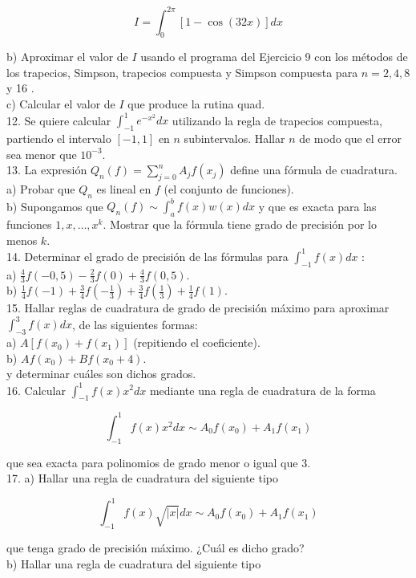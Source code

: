 \documentclass[10pt]{article}
\begin{document}
$$
I=\int_{0}^{2 \pi}[1-\cos (32 x)] d x
$$

b) Aproximar el valor de $I$ usando el programa del Ejercicio 9 con los métodos de los trapecios, Simpson, trapecios compuesta y Simpson compuesta para $n=2,4,8$ y 16 .\\
c) Calcular el valor de $I$ que produce la rutina quad.\\
12. Se quiere calcular $\int_{-1}^{1} e^{-x^{2}} d x$ utilizando la regla de trapecios compuesta, partiendo el intervalo $[-1,1]$ en $n$ subintervalos. Hallar $n$ de modo que el error sea menor que $10^{-3}$.\\
13. La expresión $Q_{n}(f)=\sum_{j=0}^{n} A_{j} f\left(x_{j}\right)$ define una fórmula de cuadratura.\\
a) Probar que $Q_{n}$ es lineal en $f$ (el conjunto de funciones).\\
b) Supongamos que $Q_{n}(f) \sim \int_{a}^{b} f(x) w(x) d x$ y que es exacta para las funciones $1, x, \ldots, x^{k}$. Mostrar que la fórmula tiene grado de precisión por lo menos $k$.\\
14. Determinar el grado de precisión de las fórmulas para $\int_{-1}^{1} f(x) d x$ :\\
a) $\frac{4}{3} f(-0,5)-\frac{2}{3} f(0)+\frac{4}{3} f(0,5)$.\\
b) $\frac{1}{4} f(-1)+\frac{3}{4} f\left(-\frac{1}{3}\right)+\frac{3}{4} f\left(\frac{1}{3}\right)+\frac{1}{4} f(1)$.\\
15. Hallar reglas de cuadratura de grado de precisión máximo para aproximar $\int_{-3}^{3} f(x) d x$, de las siguientes formas:\\
a) $A\left[f\left(x_{0}\right)+f\left(x_{1}\right)\right]$ (repitiendo el coeficiente).\\
b) $A f\left(x_{0}\right)+B f\left(x_{0}+4\right)$.\\
y determinar cuáles son dichos grados.\\
16. Calcular $\int_{-1}^{1} f(x) x^{2} d x$ mediante una regla de cuadratura de la forma

$$
\int_{-1}^{1} f(x) x^{2} d x \sim A_{0} f\left(x_{0}\right)+A_{1} f\left(x_{1}\right)
$$

que sea exacta para polinomios de grado menor o igual que 3.\\
17. a) Hallar una regla de cuadratura del siguiente tipo

$$
\int_{-1}^{1} f(x) \sqrt{|x|} d x \sim A_{0} f\left(x_{0}\right)+A_{1} f\left(x_{1}\right)
$$

que tenga grado de precisión máximo. ¿Cuál es dicho grado?\\
b) Hallar una regla de cuadratura del siguiente tipo
\end{document}
